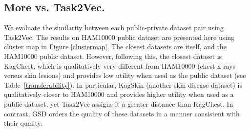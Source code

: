 \documentclass[11pt]{article}
\begin{document}
\subsection{More vs. Task2Vec.}
We evaluate the similarity between each public-private dataset pair using Task2Vec. The results on HAM10000 public dataset are presented here using cluster map in Figure \ref{clustermap}.
The closest datasets are itself, and the HAM10000 public dataset. 
However, following this, the closest dataset is KagChest, which is qualitatively very different from HAM10000 (chest x-rays versus skin lesions) and provides low utility when used as the public dataset (see Table~\ref{transferability}).
In particular, KagSkin (another skin disease dataset) is qualitatively closer to HAM10000 and provides higher utility when used as a public dataset, yet Task2Vec assigns it a greater distance than KagChest.
In contrast, GSD orders the quality of these datasets in a manner consistent with their quality.

\begin{figure*}[htbp]
    \centering
    \hfil
    \caption{Clustermaps given by Task2Vec (left) and GSD(right) for HAM10000 and corresponding public datasets. The lines on the top and the left denote the similarity of a pair of datasets. The numbers in the grid are the similarity distance for a pair of datasets. Although Task2Vec gives the correct prediction for (HAM$_{public}$, HAM$_{private}$) pair, it \textit{\textbf{incorrectly}} predicts the second-close similarity, where it believes KagChest is the second-close dataset for HAM10000, while they should be totally irrelevant.}
    \label{clustermap}
\end{figure*}

    
\end{document}
